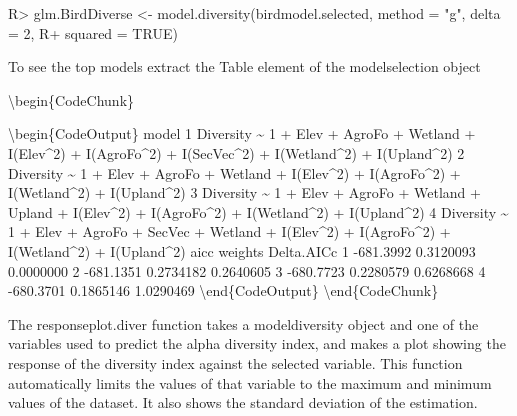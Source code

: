 \documentclass[article]{jss}
\begin{document}
\begin{CodeChunk}

\begin{CodeInput}
R> glm.BirdDiverse <- model.diversity(birdmodel.selected, method = "g", delta = 2, 
R+ squared = TRUE)
\end{CodeInput}
\end{CodeChunk}

To see the top models extract the Table element of the modelselection
object

\textbackslash{}begin\{CodeChunk\}

\textbackslash{}begin\{CodeOutput\} model 1 Diversity \textasciitilde{}
1 + Elev + AgroFo + Wetland + I(Elev\^{}2) + I(AgroFo\^{}2) +
I(SecVec\^{}2) + I(Wetland\^{}2) + I(Upland\^{}2) 2 Diversity
\textasciitilde{} 1 + Elev + AgroFo + Wetland + I(Elev\^{}2) +
I(AgroFo\^{}2) + I(Wetland\^{}2) + I(Upland\^{}2) 3 Diversity
\textasciitilde{} 1 + Elev + AgroFo + Wetland + Upland + I(Elev\^{}2) +
I(AgroFo\^{}2) + I(Wetland\^{}2) + I(Upland\^{}2) 4 Diversity
\textasciitilde{} 1 + Elev + AgroFo + SecVec + Wetland + I(Elev\^{}2) +
I(AgroFo\^{}2) + I(Wetland\^{}2) + I(Upland\^{}2) aicc weights
Delta.AICc 1 -681.3992 0.3120093 0.0000000 2 -681.1351 0.2734182
0.2640605 3 -680.7723 0.2280579 0.6268668 4 -680.3701 0.1865146
1.0290469 \textbackslash{}end\{CodeOutput\}
\textbackslash{}end\{CodeChunk\}

The responseplot.diver function takes a modeldiversity object and one of
the variables used to predict the alpha diversity index, and makes a
plot showing the response of the diversity index against the selected
variable. This function automatically limits the values of that variable
to the maximum and minimum values of the dataset. It also shows the
standard deviation of the estimation.
\end{document}
